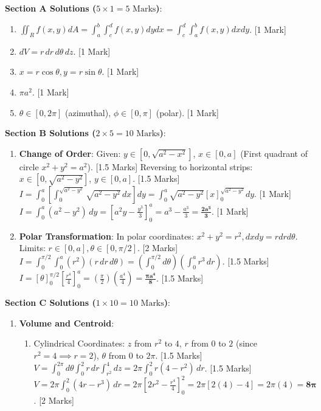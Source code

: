\begin{solutionbox}
\noindent\textbf{Section A Solutions ($5 \times 1 = 5\text{ Marks}$)}:
\begin{enumerate}
    \item $\iint_R f(x,y)dA = \int_a^b \int_c^d f(x,y)dy dx = \int_c^d \int_a^b f(x,y)dx dy$. [1 Mark]
    \item $dV = r\,dr\,d\theta\,dz$. [1 Mark]
    \item $x = r\cos\theta, y = r\sin\theta$. [1 Mark]
    \item $\pi a^2$. [1 Mark]
    \item $\theta \in [0, 2\pi]$ (azimuthal), $\phi \in [0, \pi]$ (polar). [1 Mark]
\end{enumerate}

\medskip
\noindent\textbf{Section B Solutions ($2 \times 5 = 10\text{ Marks}$)}:
\begin{enumerate}[start=6]
    \item \textbf{Change of Order}:
    Given: $y \in [0, \sqrt{a^2-x^2}]$, $x \in [0, a]$ (First quadrant of circle $x^2+y^2 = a^2$). [1.5 Marks]
    Reversing to horizontal strips: $x \in [0, \sqrt{a^2-y^2}]$, $y \in [0, a]$. [1.5 Marks]
    $I = \int_0^a \left[ \int_0^{\sqrt{a^2-y^2}} \sqrt{a^2-y^2}\,dx \right] dy = \int_0^a \sqrt{a^2-y^2} [x]_0^{\sqrt{a^2-y^2}} dy$. [1 Mark]
    $I = \int_0^a (a^2-y^2)\,dy = \left[ a^2 y - \frac{y^3}{3} \right]_0^a = a^3 - \frac{a^3}{3} = \mathbf{\frac{2a^3}{3}}$. [1 Mark]

    \item \textbf{Polar Transformation}:
    In polar coordinates: $x^2+y^2 = r^2, dx dy = r dr d\theta$. Limits: $r \in [0, a], \theta \in [0, \pi/2]$. [2 Marks]
    $I = \int_0^{\pi/2} \int_0^a (r^2)(r\,dr\,d\theta) = \left(\int_0^{\pi/2} d\theta\right) \left(\int_0^a r^3\,dr\right)$. [1.5 Marks]
    $I = [\theta]_0^{\pi/2} \left[ \frac{r^4}{4} \right]_0^a = \left(\frac{\pi}{2}\right)\left(\frac{a^4}{4}\right) = \mathbf{\frac{\pi a^4}{8}}$. [1.5 Marks]
\end{enumerate}

\medskip
\noindent\textbf{Section C Solutions ($1 \times 10 = 10\text{ Marks}$)}:
\begin{enumerate}[start=8]
    \item \textbf{Volume and Centroid}:
    \begin{enumerate}[label=(\alph*)]
        \item Cylindrical Coordinates: $z$ from $r^2$ to $4$, $r$ from $0$ to $2$ (since $r^2 = 4 \implies r = 2$), $\theta$ from $0$ to $2\pi$. [1.5 Marks]
        $V = \int_0^{2\pi} d\theta \int_0^2 r\,dr \int_{r^2}^4 dz = 2\pi \int_0^2 r(4 - r^2)\,dr$. [1.5 Marks]
        $V = 2\pi \int_0^2 (4r - r^3)\,dr = 2\pi \left[ 2r^2 - \frac{r^4}{4} \right]_0^2 = 2\pi [2(4) - 4] = 2\pi(4) = \mathbf{8\pi}$. [2 Marks]


\end{enumerate}
\end{enumerate}
\end{solutionbox}
